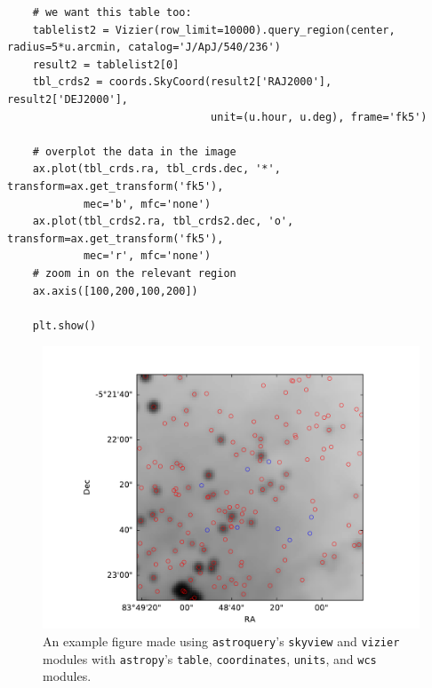 \documentclass[twocolumn]{aastex61}
\newcommand{\package}[1]{\texttt{#1}\xspace}
\newcommand{\astroquery}{\package{astroquery}}
\newcommand{\astropypkg}{\package{astropy}}
\begin{document}
\begin{lstlisting}
    # we want this table too:
    tablelist2 = Vizier(row_limit=10000).query_region(center, radius=5*u.arcmin, catalog='J/ApJ/540/236')
    result2 = tablelist2[0]
    tbl_crds2 = coords.SkyCoord(result2['RAJ2000'], result2['DEJ2000'],
                                unit=(u.hour, u.deg), frame='fk5')

    # overplot the data in the image
    ax.plot(tbl_crds.ra, tbl_crds.dec, '*', transform=ax.get_transform('fk5'),
            mec='b', mfc='none')
    ax.plot(tbl_crds2.ra, tbl_crds2.dec, 'o', transform=ax.get_transform('fk5'),
            mec='r', mfc='none')
    # zoom in on the relevant region
    ax.axis([100,200,100,200])

    plt.show()

\end{lstlisting}

\begin{figure}[!htp]
\includegraphics[scale=1,width=7in]{example_figure_1.pdf}
\caption{An example figure made using \astroquery's \texttt{skyview} and
\texttt{vizier} modules with \astropypkg's \texttt{table}, \texttt{coordinates},
\texttt{units}, and \texttt{wcs} modules.}
\label{fig:example1}
\end{figure}
\end{document}
